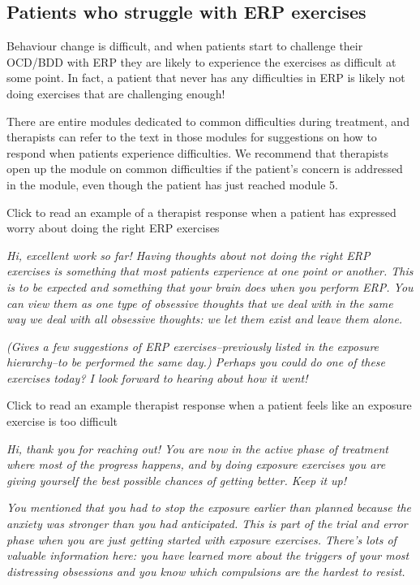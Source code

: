 \documentclass[]{book}
\begin{document}
\hypertarget{patients-who-struggle-with-erp-exercises}{%
\subsection{Patients who struggle with ERP exercises}\label{patients-who-struggle-with-erp-exercises}}

Behaviour change is difficult, and when patients start to challenge their OCD/BDD with ERP they are likely to experience the exercises as difficult at some point. In fact, a patient that never has any difficulties in ERP is likely not doing exercises that are challenging enough!

There are entire modules dedicated to common difficulties during treatment, and therapists can refer to the text in those modules for suggestions on how to respond when patients experience difficulties. We recommend that therapists open up the module on common difficulties if the patient's concern is addressed in the module, even though the patient has just reached module 5.

 Click to read an example of a therapist response when a patient has expressed worry about doing the right ERP exercises

\emph{Hi, excellent work so far! Having thoughts about not doing the right ERP exercises is something that most patients experience at one point or another. This is to be expected and something that your brain does when you perform ERP. You can view them as one type of obsessive thoughts that we deal with in the same way we deal with all obsessive thoughts: we let them exist and leave them alone.}

\emph{(Gives a few suggestions of ERP exercises--previously listed in the exposure hierarchy--to be performed the same day.) Perhaps you could do one of these exercises today? I look forward to hearing about how it went!}

 Click to read an example therapist response when a patient feels like an exposure exercise is too difficult

\emph{Hi, thank you for reaching out! You are now in the active phase of treatment where most of the progress happens, and by doing exposure exercises you are giving yourself the best possible chances of getting better. Keep it up!}

\emph{You mentioned that you had to stop the exposure earlier than planned because the anxiety was stronger than you had anticipated. This is part of the trial and error phase when you are just getting started with exposure exercises. There's lots of valuable information here: you have learned more about the triggers of your most distressing obsessions and you know which compulsions are the hardest to resist.}
\end{document}
